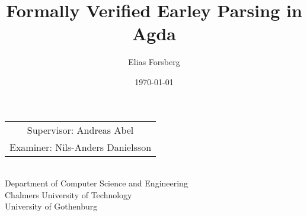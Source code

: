 \documentclass{beamer}
\begin{document}
	\title{Formally Verified Earley Parsing in Agda}
	\author{Elias Forsberg}
	\date{\today}
	
	\begin{frame}
		\maketitle
		\centering
		\begin{tabular}{c}
			Supervisor: Andreas Abel \\ Examiner: Nils-Anders Danielsson
		\end{tabular}\\
		\flushleft
		{\tiny Department of Computer Science and Engineering\\}
		{\tiny \sc Chalmers University of Technology\\}
		{\tiny \sc University of Gothenburg\\}
	
	\end{frame}
	

	
	
\end{document}
